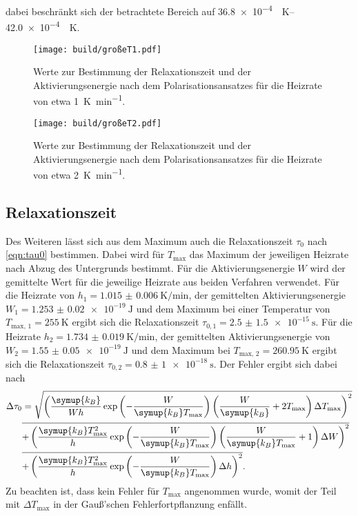 dabei beschränkt sich der betrachtete Bereich auf \SIrange{36.8e-4}{42.0e-4}{\per\kelvin}.
\begin{figure}[htb]
  \centering
  \texttt{[image: build/großeT1.pdf]}
  \caption{Werte zur Bestimmung der Relaxationszeit und der Aktivierungsenergie nach dem Polarisationsansatzes für die Heizrate von etwa \SI{1}{\kelvin\per\minute}.}
  \label{fig:grT1}
\end{figure}
\begin{figure}[htb]
  \centering
  \texttt{[image: build/großeT2.pdf]}
  \caption{Werte zur Bestimmung der Relaxationszeit und der Aktivierungsenergie nach dem Polarisationsansatzes für die Heizrate von etwa \SI{2}{\kelvin\per\minute}.}
  \label{fig:grT2}
\end{figure}
\FloatBarrier

\subsection{Relaxationszeit}
\label{sec:relax}
Des Weiteren lässt sich aus dem Maximum auch die Relaxationszeit $\tau_0$ nach \eqref{eqn:tau0}
bestimmen. Dabei wird für $T_\text{max}$ das Maximum der jeweiligen Heizrate nach Abzug des Untergrunds bestimmt.
Für die Aktivierungsenergie $W$ wird der gemittelte Wert für die jeweilige Heizrate aus beiden Verfahren verwendet.
Für die Heizrate von $h_1=\SI{1.015(6)}{\kelvin\per\minute}$, der gemittelten Aktivierungsenergie $W_1 = \SI{1.253(20)e-19}{\joule}$ und dem 
Maximum bei einer Temperatur von $T_\text{max, 1} = \SI{255}{\kelvin}$ ergibt sich die Relaxationszeit $\tau_{0,1} = \SI{2.5(15)e-15}{\second}$. 
Für die Heizrate $h_2=\SI{1.734(19)}{\kelvin\per\minute}$, der gemittelten Aktivierungsenergie von $W_2 = \SI{1.55(5)e-19}{\joule}$ und dem 
Maximum bei $T_\text{max, 2} = \SI{260.95}{\kelvin}$ ergibt sich die Relaxationszeit $\tau_{0,2} = \SI{0.8(10)e-18}{\second}$.
Der Fehler ergibt sich dabei nach
\begin{align*}
    \label{eqn:FehlerTau}
    \Delta \tau_0 & = \sqrt{\left(\frac{\symup{k_B}}{W h} \exp\left(-\frac{W}{\symup{k_B} T_\text{max}}\right) \left(\frac{W}{\symup{k_B}} + 2 T_\text{max}\right) \Delta T_\text{max} \right)^2} \\ 
    &\overline{+ \left(\frac{\symup{k_B} T_\text{max}^2}{h} \exp\left(-\frac{W}{\symup{k_B} T_\text{max}}\right)\left(\frac{W}{\symup{k_B}T_\text{max}} + 1 \right) \Delta W \right)^2} \\ 
    &\overline{+ \left(\frac{\symup{k_B} T_\text{max}^2}{h} \exp\left(-\frac{W}{\symup{k_B} T_\text{max}}\right)\Delta h \right)^2}.
\end{align*}
Zu beachten ist, dass kein Fehler für $T_\text{max}$ angenommen wurde, womit der Teil mit $\Delta T_\text{max}$ in der Gauß'schen Fehlerfortpflanzung enfällt.


\FloatBarrier